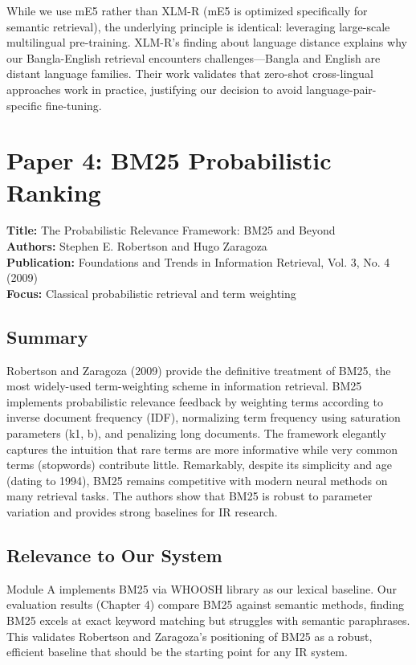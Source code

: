 \documentclass[12pt,a4paper]{report}
\begin{document}
While we use mE5 rather than XLM-R (mE5 is optimized specifically for semantic retrieval), the underlying principle is identical: leveraging large-scale multilingual pre-training. XLM-R's finding about language distance explains why our Bangla-English retrieval encounters challenges---Bangla and English are distant language families. Their work validates that zero-shot cross-lingual approaches work in practice, justifying our decision to avoid language-pair-specific fine-tuning.

\vspace{0.5cm}

\section{Paper 4: BM25 Probabilistic Ranking}

\textbf{Title:} The Probabilistic Relevance Framework: BM25 and Beyond \\
\textbf{Authors:} Stephen E. Robertson and Hugo Zaragoza \\
\textbf{Publication:} Foundations and Trends in Information Retrieval, Vol. 3, No. 4 (2009) \\
\textbf{Focus:} Classical probabilistic retrieval and term weighting

\subsection*{Summary}

Robertson and Zaragoza (2009) provide the definitive treatment of BM25, the most widely-used term-weighting scheme in information retrieval. BM25 implements probabilistic relevance feedback by weighting terms according to inverse document frequency (IDF), normalizing term frequency using saturation parameters (k1, b), and penalizing long documents. The framework elegantly captures the intuition that rare terms are more informative while very common terms (stopwords) contribute little. Remarkably, despite its simplicity and age (dating to 1994), BM25 remains competitive with modern neural methods on many retrieval tasks. The authors show that BM25 is robust to parameter variation and provides strong baselines for IR research.

\subsection*{Relevance to Our System}

Module A implements BM25 via WHOOSH library as our lexical baseline. Our evaluation results (Chapter 4) compare BM25 against semantic methods, finding BM25 excels at exact keyword matching but struggles with semantic paraphrases. This validates Robertson and Zaragoza's positioning of BM25 as a robust, efficient baseline that should be the starting point for any IR system.
\end{document}
